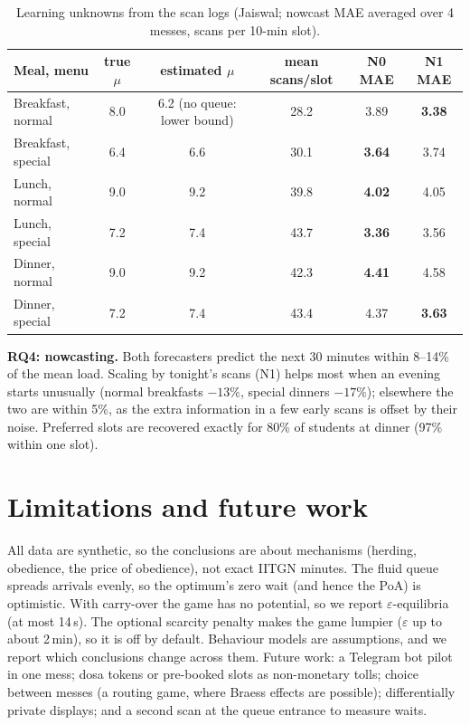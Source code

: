 \documentclass{article}
\begin{document}
\begin{table}[H]\centering\small
\caption{Learning unknowns from the scan logs (Jaiswal; nowcast MAE averaged over 4 messes, scans per 10-min slot).}\label{tab:data}
\begin{tabular}{lccccc}\toprule
Meal, menu & true $\mu$ & estimated $\mu$ & mean scans/slot & N0 MAE & N1 MAE\\\midrule
Breakfast, normal & 8.0 & 6.2 (no queue: lower bound) & 28.2 & 3.89 & \textbf{3.38}\\
Breakfast, special & 6.4 & 6.6 & 30.1 & \textbf{3.64} & 3.74\\
Lunch, normal & 9.0 & 9.2 & 39.8 & \textbf{4.02} & 4.05\\
Lunch, special & 7.2 & 7.4 & 43.7 & \textbf{3.36} & 3.56\\
Dinner, normal & 9.0 & 9.2 & 42.3 & \textbf{4.41} & 4.58\\
Dinner, special & 7.2 & 7.4 & 43.4 & 4.37 & \textbf{3.63}\\
\bottomrule\end{tabular}\end{table}
\vspace{-0.4em}
\noindent\textbf{RQ4: nowcasting.} Both forecasters predict the next 30 minutes within 8--14\% of the mean load.
Scaling by tonight's scans (N1) helps most when an evening starts unusually (normal breakfasts $-13\%$, special
dinners $-17\%$); elsewhere the two are within 5\%, as the extra information in a few early scans is offset by their
noise. Preferred slots are recovered exactly for 80\% of students at dinner (97\% within one slot).

\section{Limitations and future work}
All data are synthetic, so the conclusions are about mechanisms (herding, obedience, the price of obedience), not
exact IITGN minutes. The fluid queue spreads arrivals evenly, so the optimum's zero wait (and hence the PoA) is
optimistic. With carry-over the game has no potential, so we report $\varepsilon$-equilibria (at most 14\,s). The
optional scarcity penalty makes the game lumpier ($\varepsilon$ up to about 2\,min), so it is off by default. Behaviour
models are assumptions, and we report which conclusions change across them. Future work: a Telegram bot pilot in one
mess; dosa tokens or pre-booked slots as non-monetary tolls; choice between messes (a routing game, where Braess
effects are possible); differentially private displays; and a second scan at the queue entrance to measure waits.
\end{document}
